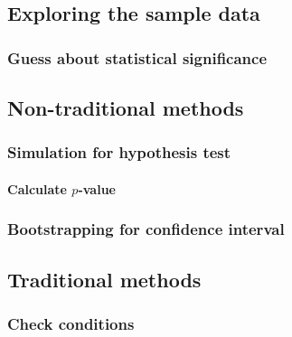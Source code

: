 \documentclass[
  12pt, krantz2,
]{krantz}
\begin{document}
\hypertarget{exploring-the-sample-data-1}{%
\subsection{Exploring the sample data}\label{exploring-the-sample-data-1}}

\hypertarget{guess-about-statistical-significance-1}{%
\subsubsection*{Guess about statistical significance}\label{guess-about-statistical-significance-1}}


\hypertarget{non-traditional-methods-1}{%
\subsection{Non-traditional methods}\label{non-traditional-methods-1}}

\hypertarget{simulation-for-hypothesis-test}{%
\subsubsection*{Simulation for hypothesis test}\label{simulation-for-hypothesis-test}}


\hypertarget{calculate-p-value-1}{%
\paragraph{\texorpdfstring{Calculate \(p\)-value}{Calculate p-value}}\label{calculate-p-value-1}}

\hypertarget{bootstrapping-for-confidence-interval-1}{%
\subsubsection*{Bootstrapping for confidence interval}\label{bootstrapping-for-confidence-interval-1}}


\hypertarget{traditional-methods-1}{%
\subsection{Traditional methods}\label{traditional-methods-1}}

\hypertarget{check-conditions-1}{%
\subsubsection*{Check conditions}\label{check-conditions-1}}
\end{document}
